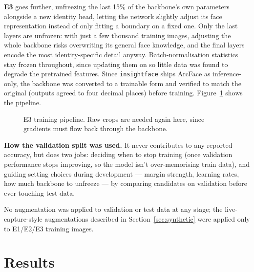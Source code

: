 \documentclass[11pt]{article}
\begin{document}
\textbf{E3} goes further, unfreezing the last 15\% of the backbone's own parameters alongside a new identity head, letting the network slightly adjust its face representation instead of only fitting a boundary on a fixed one. Only the last layers are unfrozen: with just a few thousand training images, adjusting the whole backbone risks overwriting its general face knowledge, and the final layers encode the most identity-specific detail anyway. Batch-normalisation statistics stay frozen throughout, since updating them on so little data was found to degrade the pretrained features. Since \texttt{insightface} ships ArcFace as inference-only, the backbone was converted to a trainable form and verified to match the original (outputs agreed to four decimal places) before training. Figure~\ref{fig:pipeline-e3} shows the pipeline.

\begin{figure}[htbp]
\centering
{}
\caption{E3 training pipeline. Raw crops are needed again here, since gradients must flow back through the backbone.}
\label{fig:pipeline-e3}
\end{figure}

\textbf{How the validation split was used.} It never contributes to any reported accuracy, but does two jobs: deciding when to stop training (once validation performance stops improving, so the model isn't over-memorising train data), and guiding setting choices during development --- margin strength, learning rates, how much backbone to unfreeze --- by comparing candidates on validation before ever touching test data.

No augmentation was applied to validation or test data at any stage; the live-capture-style augmentations described in Section~\ref{sec:synthetic} were applied only to E1/E2/E3 training images.

\section{Results}
\label{sec:results}
\end{document}
